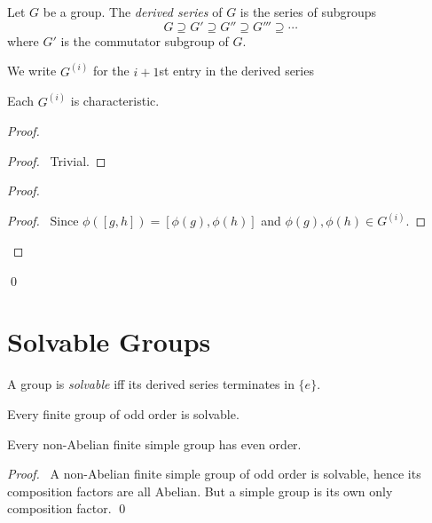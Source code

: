 \begin{df}
Let $G$ be a group. The \emph{derived series} of $G$ is the series of subgroups
\[ G \supseteq G' \supseteq G'' \supseteq G''' \supseteq \cdots \]
where $G'$ is the commutator subgroup of $G$.

We write $G^{(i)}$ for the $i+1$st entry in the derived series
\end{df}

\begin{prop}
\label{prop:derived-group-characteristic}
Each $G^{(i)}$ is characteristic.
\end{prop}

\begin{proof}
\pf
{}
\begin{proof}
	\pf\ Trivial.
\end{proof}
\begin{proof}
	\begin{proof}
		\pf\ Since $\phi([g,h]) = [\phi(g),\phi(h)]$ and $\phi(g),\phi(h) \in G^{(i)}$.
	\end{proof}
\end{proof}
\qed
\end{proof}

\section{Solvable Groups}

\begin{df}[Solvable]
A group is \emph{solvable} iff its derived series terminates in $\{e\}$.
\end{df}

\begin{thm}
Every finite group of odd order is solvable.
\end{thm}


\begin{cor}
Every non-Abelian finite simple group has even order.
\end{cor}

\begin{proof}
\pf\ A non-Abelian finite simple group of odd order is solvable, hence its composition factors are all Abelian. But a simple group is its own only composition factor. \qed
\end{proof}

